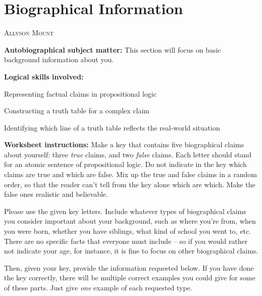 \documentclass[oneside, openany]{book} %
\makeatletter
\newcommand\chapterauthor[1]{\authortoc{#1}\printchapterauthor{#1}}
\newcommand{\printchapterauthor}[1]{%
 {\parindent0pt\vspace*{-25pt}%
 \linespread{1.1}\large\scshape#1%
 \par\nobreak\vspace*{35pt}}
 \@afterheading%
}
\newcommand{\authortoc}[1]{%
 \addtocontents{toc}{\vskip-10pt}%
 \addtocontents{toc}{%
  \protect\contentsline{chapter}%
  {\hskip1.3em\mdseries\scshape\protect\scriptsize#1}{}{}}
 \addtocontents{toc}{\vskip5pt}%
}
\makeatother
\begin{document}
\chapter{Biographical Information}

\chapterauthor{Allyson Mount}

\noindent \textbf{Autobiographical subject matter: }This section will focus on basic background information about you.

\noindent 

\noindent \textbf{Logical skills involved:}

\noindent 

\noindent  Representing factual claims in propositional logic

\noindent 

\noindent  Constructing a truth table for a complex claim

\noindent 

\noindent  Identifying which line of a truth table reflects the real-world situation

\noindent 

\noindent 

\noindent \textbf{Worksheet instructions: }Make a key that contains five biographical claims about yourself: three \textit{true }claims, and two \textit{false }claims. Each letter should stand for an atomic sentence of propositional logic. Do not indicate in the key which claims are true and which are false. Mix up the true and false claims in a random order, so that the reader can't tell from the key alone which are which. Make the false ones realistic and believable.

\noindent 

\noindent Please use the given key letters. Include whatever types of biographical claims you consider important about your background, such as where you're from, when you were born, whether you have siblings, what kind of school you went to, etc. There are no specific facts that everyone must include -- so if you would rather not indicate your age, for instance, it is fine to focus on other biographical claims.

\noindent 

\noindent Then, given your key, provide the information requested below. If you have done the key correctly, there will be multiple correct examples you could give for some of these parts. Just give \textit{one }example of each requested type.

\noindent 
\end{document}
